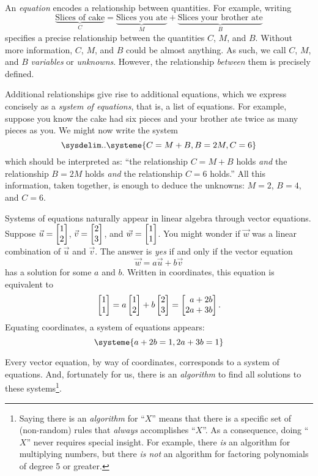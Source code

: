 	\label{APPSLEI}

	An \emph{equation} encodes a relationship between quantities. For
	example, writing
	\[
		\underbrace{\text{Slices of cake}}_C = \underbrace{\text{Slices you ate}}_M + \underbrace{\text{Slices your brother ate}}_B
	\]
	specifies a precise relationship between the quantities $C$, $M$, and $B$. 
	Without more information, $C$, $M$, and $B$ could be almost anything. As such, we call 
	$C$, $M$, and $B$
	\emph{variables} or \emph{unknowns}. 
	However, the
	relationship \emph{between} them is precisely defined. 

	Additional relationships give rise to additional equations, which we express concisely as a
	\emph{system of equations}, that is, a list of equations. For example, suppose you know the cake
	had six pieces and your brother ate twice as many pieces as you. We might now write the system
	\[
		\sysdelim..
		\systeme{C=M+B,B=2M,C=6}
	\]
	which should be interpreted as: ``the relationship $C=M+B$ holds \emph{and} the relationship $B=2M$ holds \emph{and}
	the relationship $C=6$ holds.''
	All this information, taken together, is enough to deduce the unknowns: $M=2$, $B=4$, and $C=6$.

	Systems of equations naturally appear in linear algebra through vector equations. Suppose $\vec u=\mat{1\\2}$, $\vec v=\mat{2\\3}$,
	and $\vec w=\mat{1\\1}$. You might wonder if $\vec w$ was a linear combination of $\vec u$ and $\vec v$. The answer is \emph{yes} if and
	only if the vector equation
	\[
		\vec w=a\vec u+b\vec v
	\]
	has a solution for some $a$ and $b$. Written in coordinates, this equation is equivalent to
	\[
		\mat{1\\1}=a\mat{1\\2}+b\mat{2\\3} = \mat{a+2b\\2a+3b}.
	\]
	Equating coordinates, a system of equations appears:
	\[
		\systeme{a+2b=1,2a+3b=1}
	\]

	Every vector equation, by way of coordinates, corresponds to a system of equations. And, fortunately for us, there is
	an \emph{algorithm} to find all solutions to these systems\footnote{ Saying there is an \emph{algorithm} for ``$X$''
	means that there is a specific set of (non-random) rules that \emph{always} accomplishes ``$X$''. As a consequence, doing
	``$X$'' never requires special insight. For example, there \emph{is} an algorithm for multiplying numbers, but there \emph{is not}
	an algorithm for factoring polynomials of degree 5 or greater.}.


